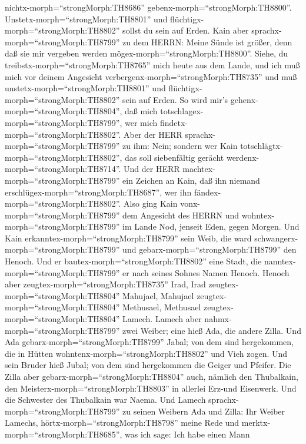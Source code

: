 nichtx-morph=``strongMorph:TH8686'' gebenx-morph=``strongMorph:TH8800''.
Unstetx-morph=``strongMorph:TH8801'' und
flüchtigx-morph=``strongMorph:TH8802'' sollst du sein auf Erden.
 Kain aber sprachx-morph=``strongMorph:TH8799'' zu dem
HERRN: Meine Sünde ist größer, denn daß sie mir vergeben werden
mögex-morph=``strongMorph:TH8800''.  Siehe, du
treibstx-morph=``strongMorph:TH8765'' mich heute aus dem Lande, und ich
muß mich vor deinem Angesicht verbergenx-morph=``strongMorph:TH8735''
und muß unstetx-morph=``strongMorph:TH8801'' und
flüchtigx-morph=``strongMorph:TH8802'' sein auf Erden. So wird mir's
gehenx-morph=``strongMorph:TH8804'', daß mich
totschlagex-morph=``strongMorph:TH8799'', wer mich
findetx-morph=``strongMorph:TH8802''.  Aber der HERR
sprachx-morph=``strongMorph:TH8799'' zu ihm: Nein; sondern wer Kain
totschlägtx-morph=``strongMorph:TH8802'', das soll siebenfältig gerächt
werdenx-morph=``strongMorph:TH8714''. Und der HERR
machtex-morph=``strongMorph:TH8799'' ein Zeichen an Kain, daß ihn
niemand erschlügex-morph=``strongMorph:TH8687'', wer ihn
fändex-morph=``strongMorph:TH8802''.  Also ging Kain
vonx-morph=``strongMorph:TH8799'' dem Angesicht des HERRN und
wohntex-morph=``strongMorph:TH8799'' im Lande Nod, jenseit Eden, gegen
Morgen.  Und Kain erkanntex-morph=``strongMorph:TH8799''
sein Weib, die ward schwangerx-morph=``strongMorph:TH8799'' und
gebarx-morph=``strongMorph:TH8799'' den Henoch. Und er
bautex-morph=``strongMorph:TH8802'' eine Stadt, die
nanntex-morph=``strongMorph:TH8799'' er nach seines Sohnes Namen Henoch.
 Henoch aber zeugtex-morph=``strongMorph:TH8735'' Irad,
Irad zeugtex-morph=``strongMorph:TH8804'' Mahujael, Mahujael
zeugtex-morph=``strongMorph:TH8804'' Methusael, Methusael
zeugtex-morph=``strongMorph:TH8804'' Lamech.  Lamech aber
nahmx-morph=``strongMorph:TH8799'' zwei Weiber; eine hieß Ada, die
andere Zilla.  Und Ada gebarx-morph=``strongMorph:TH8799''
Jabal; von dem sind hergekommen, die in Hütten
wohntenx-morph=``strongMorph:TH8802'' und Vieh zogen.  Und
sein Bruder hieß Jubal; von dem sind hergekommen die Geiger und Pfeifer.
 Die Zilla aber gebarx-morph=``strongMorph:TH8804'' auch,
nämlich den Thubalkain, den Meisterx-morph=``strongMorph:TH8803'' in
allerlei Erz-und Eisenwerk. Und die Schwester des Thubalkain war Naema.
 Und Lamech sprachx-morph=``strongMorph:TH8799'' zu seinen
Weibern Ada und Zilla: Ihr Weiber Lamechs,
hörtx-morph=``strongMorph:TH8798'' meine Rede und
merktx-morph=``strongMorph:TH8685'', was ich sage: Ich habe einen Mann

